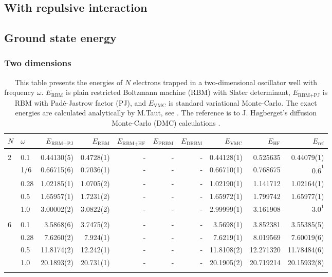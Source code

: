\begin{landscape}
\section{With repulsive interaction}
\subsection{Ground state energy}
\subsubsection{Two dimensions}
\begin{table} [H]
	\caption{This table presents the energies of $N$ electrons trapped in a two-dimensional oscillator well with frequency $\omega$. $E_{\text{RBM}}$ is plain restricted Boltzmann machine (RBM) with Slater determinant, $E_{\text{RBM+PJ}}$ is RBM with Padé-Jastrow factor (PJ), and $E_{\text{VMC}}$ is standard variational Monte-Carlo. The exact energies are calculated analytically by M.Taut, see \cite{taut_two_1994}. The reference is to J. Høgberget's diffusion Monte-Carlo (DMC) calculations \cite{hogberget_quantum_2013}.} 
	\begin{tabularx}{\hsize}{l:l|RRRRRRRR} \hline\hline
		\label{tab:quantumdotswinteraction2D1}
		$N$ & $\omega$ & $E_{\text{RBM+PJ}}$ & $E_{\text{RBM}}$ & $E_{\text{RBM+HF}}$ & $E_{\text{PRBM}}$ & $E_{\text{DRBM}}$ & $E_{\text{VMC}}$ & $E_{\text{HF}}$ & $E_{\text{ref}}$ \\ \hline \\
		2 & 0.1 & 0.44130(5) & 0.4728(1) & - & - & - & 0.44128(1) & 0.525635 & 0.44079(1) \\ 
		& 1/6 & 0.66715(6) & 0.7036(1) & - & - & - & 0.66710(1) & 0.768675 & $0.\bar{6}^{1}$ \\
		& 0.28 & 1.02185(1) & 1.0705(2) & - & - & - & 1.02190(1) & 1.141712 & 1.02164(1) \\
		& 0.5 & 1.65957(1) & 1.7231(2) & - & - & - & 1.65972(1) & 1.799742 & 1.65977(1)  \\
		& 1.0 & 3.00002(2) & 3.0822(2) & - & - & - & 2.99999(1) & 3.161908 & $3.0^{1}$ \\ \hdashline \\

		6 & 0.1 & 3.5868(6) & 3.7475(2) & - & - & - & 3.5698(1) & 3.852381 & 3.55385(5) \\ 
		& 0.28 & 7.6260(2) & 7.924(1) & - & - & - & 7.6219(1) & 8.019569 & 7.60019(6) \\
		& 0.5 & 11.8174(2) & 12.242(1) & - & - & - & 11.8108(2) & 12.271320 & 11.78484(6) \\
		& 1.0 & 20.1893(2) & 20.731(1) & - & - & - & 20.1905(2) & 20.719214 & 20.15932(8) \\ \hdashline \\
		

\end{tabularx}
\end{table}
\end{landscape}
